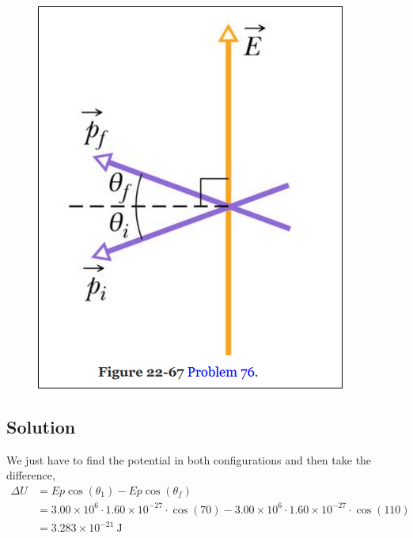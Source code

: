 \documentclass{article}
\newcommand{\J}{\text{J}}
\begin{document}
\begin{figure}[ht]
    \centering
    \includegraphics[scale=0.4]{image-2.png}
\end{figure}

\subsection*{Solution}
We just have to find the potential in both configurations and then take the difference,
\begin{align*}
	\Delta U &= Ep\cos(\theta_1) - Ep\cos(\theta_f) \\
			 &= 3.00 \times 10^6 \cdot 1.60 \times 10^{-27} \cdot \cos(70) - 3.00 \times 10^6 \cdot 1.60 \times 10^{-27} \cdot \cos(110) \\
			 &= \boxed{3.283\times10^{-21}\ \J}
\end{align*}

\end{document}
